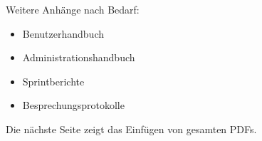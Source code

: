 \documentclass[
	papersize=A4,
	fontsize=12pt, 
	laterality=oneside, 
	draft=false,
	parskip=half,
	BCOR=0mm,
	linespread=1.15,
	language={english,ngerman},
	biblatex, %
	bibfile=99--references.bib,
	biblatexstyle=alphabetic,
	biblatexdashed=false,  %
	biblatexbackref=true,  %
	bibtexstyle=alpha, 
	dispositioncolor={30,103,182},
	colorlinks=true, %
    titlepage=titlepage,
	todonotesoptions={color=Dandelion,bordercolor=white},
	addcolophon=false, %
	addlistoftodos=false, %
]{longdoc}
\begin{document}








% 
\appendix
{}
\LDinsertbibliography
\listoffigures
\listoftables





Weitere Anhänge nach Bedarf:

\begin{itemize}
\item Benutzerhandbuch
\item Administrationshandbuch
\item Sprintberichte
\item  Besprechungsprotokolle
\end{itemize}

Die nächste Seite zeigt das Einfügen von gesamten PDFs.
% 


\end{document}
